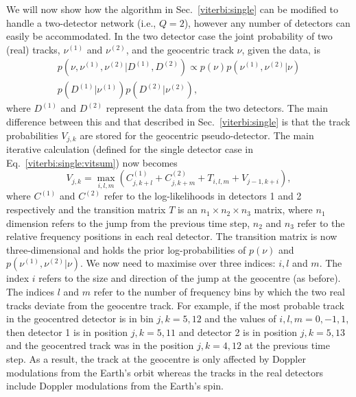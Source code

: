 We will now show how the algorithm in Sec.~\ref{viterbi:single} can be modified to handle a two-detector network (i.e., $Q=2$),  however any number of detectors can easily be accommodated. In the two detector case the joint probability of two (real) tracks, $\nu^{(1)}$ and $\nu^{(2)}$, and the geocentric track $\nu$, given the data, is
%
\begin{equation}
\begin{split}
p(\nu,\nu^{(1)},\nu^{(2)} | D^{(1)},D^{(2)}) \propto p(\nu)p(\nu^{(1)},\nu^{(2)} | \nu) \\
p(D^{(1)} | \nu^{(1)})p(D^{(2)} | \nu^{(2)}),
\end{split}
\end{equation}
%
where $D^{(1)}$ and $D^{(2)}$ represent the data from the two detectors. The
main difference between this and that described in Sec.~\ref{viterbi:single} is
that the track probabilities $V_{j,k}$ are stored for the geocentric
pseudo-detector. The main iterative calculation (defined for the single
detector case in Eq.~\ref{viterbi:single:vitsum}) now becomes
%
\begin{equation}
\label{viterbi:multidet:vitsum}
  V_{j,k} = \max_{i,l,m}({C}^{(1)}_{j,k+l} + {C}^{(2)}_{j,k+m} + T_{i,l,m} +V_{j-1,k+i}),
\end{equation}
%
where ${C}^{(1)}$ and ${C}^{(2)}$ refer to the log-likelihoods in detectors 1 and 2 respectively and the transition matrix $T$ is an $n_1\times n_2 \times n_3$ matrix, where $n_1$ dimension refers to the jump from the previous time step, $n_2$ and $n_3$ refer to the relative frequency positions in each real detector. The transition matrix is now three-dimensional and holds the prior log-probabilities of $p(\nu)$ and $p(\nu^{(1)},\nu^{(2)} | \nu)$.  We now need to maximise over three indices: $i,l$ and $m$. The index $i$ refers to the size and direction of the jump at the geocentre (as before). The indices $l$ and $m$ refer to the number of frequency bins by which the two real tracks deviate from the geocentre track. For example, if the most probable track in the geocentred detector is in bin $j,k = 5,12$ and the values of $i,l,m = 0,-1,1$, then detector 1 is in position $j,k={5,11}$ and detector 2 is in position $j,k={5,13}$ and the geocentred track was in the position $j,k={4,12}$ at the previous time step. As a result, the track at the geocentre is only affected by Doppler modulations from the Earth's orbit whereas the tracks in the real detectors include Doppler modulations from the Earth's spin.

